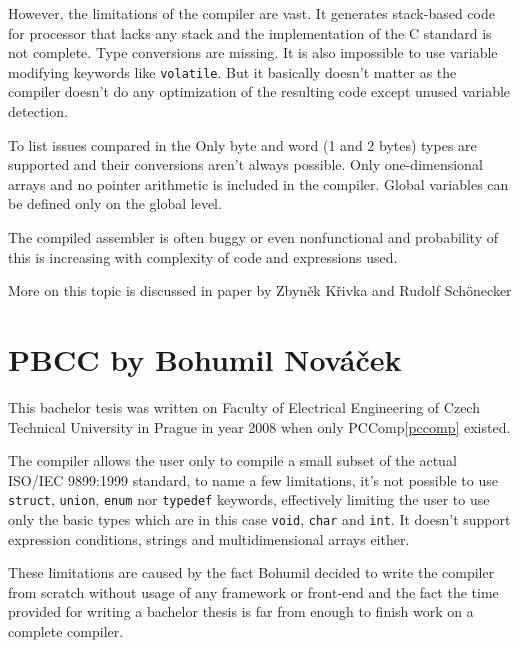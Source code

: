     However, the limitations of the compiler are vast. It generates stack-based code for processor that lacks any stack and the implementation of the C standard is not complete. Type conversions are missing. It is also impossible to use variable modifying keywords like \texttt{volatile}. But it basically doesn't matter as the compiler doesn't do any optimization %
    of the resulting code except unused variable detection.

    To list issues compared in the %
    Only byte and word (1 and 2 bytes) types are supported and their conversions aren't always possible. Only one-dimensional arrays and no pointer arithmetic is included in the compiler. Global variables can be defined only on the global level.

    The compiled assembler is often buggy or even nonfunctional and probability of this is increasing with complexity of code and expressions used.

    More on this topic is discussed in paper by Zbyněk Křivka and Rudolf Schönecker %


    \section{PBCC by Bohumil Nováček}\label{not_quite_c}
    
    This bachelor tesis was written on Faculty of Electrical Engineering of Czech Technical University in Prague in year 2008 when only PCComp\ref{pccomp} existed.
    
    The compiler allows the user only to compile a 
    small subset of the actual ISO/IEC 9899:1999 standard,
    to name a few limitations, it's not possible to use 
    \texttt{struct}, \texttt{union}, \texttt{enum} nor \texttt{typedef} keywords,
    effectively limiting the user to use only the basic types which are in this case \texttt{void}, \texttt{char} and \texttt{int}.
    It doesn't support expression conditions, strings and multidimensional arrays either.
    
    These limitations are caused by the fact Bohumil decided to write the compiler 
    from scratch without usage of any framework or front-end and the fact the time provided
    for writing a bachelor thesis is far from enough to finish work on a complete compiler.
    

